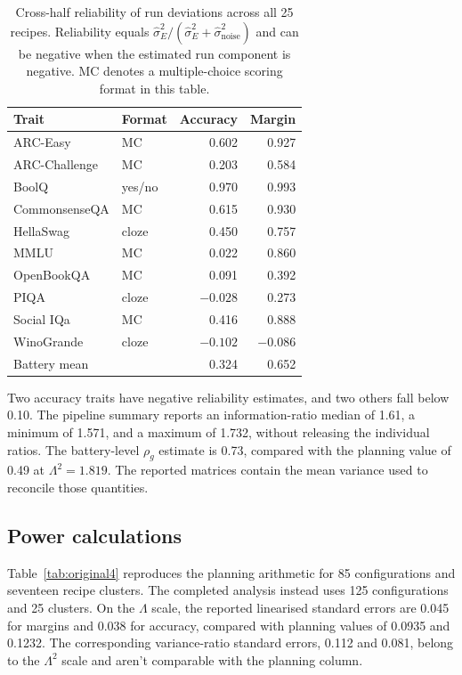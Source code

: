 \begin{table}[!htb]
\centering
\caption{Cross-half reliability of run deviations across all 25 recipes. Reliability equals $\widehat\sigma_E^2/(\widehat\sigma_E^2+\widehat\sigma_{\mathrm{noise}}^2)$ and can be negative when the estimated run component is negative. MC denotes a multiple-choice scoring format in this table.}
\label{tab:original3}
\small\setlength{\tabcolsep}{4pt}\renewcommand{\arraystretch}{1.12}
\begin{tabular}{llrr}\toprule
Trait & Format & Accuracy & Margin\\\midrule
ARC-Easy & MC & 0.602 & 0.927\\
ARC-Challenge & MC & 0.203 & 0.584\\
BoolQ & yes/no & 0.970 & 0.993\\
CommonsenseQA & MC & 0.615 & 0.930\\
HellaSwag & cloze & 0.450 & 0.757\\
MMLU & MC & 0.022 & 0.860\\
OpenBookQA & MC & 0.091 & 0.392\\
PIQA & cloze & $-0.028$ & 0.273\\
Social IQa & MC & 0.416 & 0.888\\
WinoGrande & cloze & $-0.102$ & $-0.086$\\
Battery mean & & 0.324 & 0.652\\\bottomrule
\end{tabular}
\end{table}

Two accuracy traits have negative reliability estimates, and two others fall below 0.10. The pipeline summary reports an information-ratio median of 1.61, a minimum of 1.571, and a maximum of 1.732, without releasing the individual ratios. The battery-level $\rho_g$ estimate is 0.73, compared with the planning value of 0.49 at $\Lambda^2=1.819$. The reported matrices contain the mean variance used to reconcile those quantities.

\subsection{Power calculations}
Table~\ref{tab:original4} reproduces the planning arithmetic for 85 configurations and seventeen recipe clusters. The completed analysis instead uses 125 configurations and 25 clusters. On the $\Lambda$ scale, the reported linearised standard errors are 0.045 for margins and 0.038 for accuracy, compared with planning values of 0.0935 and 0.1232. The corresponding variance-ratio standard errors, 0.112 and 0.081, belong to the $\Lambda^2$ scale and aren't comparable with the planning column.

